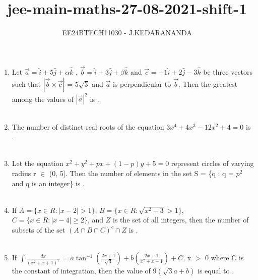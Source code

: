 \documentclass[journal]{IEEEtran}
\renewcommand{\thefigure}{\theenumi}
\renewcommand{\thetable}{\theenumi}
\numberwithin{equation}{enumi}
\numberwithin{figure}{enumi}
\renewcommand{\thetable}{\theenumi}
\begin{document}

\vspace{3cm}

\title{jee-main-maths-27-08-2021-shift-1}
\author{EE24BTECH11030 - J.KEDARANANDA}
{\let\newpage\relax\maketitle}
\renewcommand{\thefigure}{\theenumi}
\renewcommand{\thetable}{\theenumi}
\begin{enumerate}
    \item Let $\overset{\rightarrow}{a} = \hat{i} + 5\hat{j} + \alpha \hat{k}$ , $\overset{\rightarrow}{b} = \hat{i} + 3\hat{j} + \beta \hat{k}$ and $\overset{\rightarrow}{c} = -1\hat{i} + 2\hat{j} - 3\hat{k}$ be three vectors such that $|\overset{\rightarrow}{b} \times \overset{\rightarrow}{c}|$ = $5\sqrt{3}$ and
    $\overset{\rightarrow}{a}$ is perpendicular to $\overset{\rightarrow}{b}$. Then the greatest among the values of ${|\overset{\rightarrow}{a}|}^2$ is \underline{\hspace{1cm}}.\\\\
    \item The number of distinct real roots of the equation $3x^4 + 4x^3 - 12x^2 + 4 = 0$ is  \underline{\hspace{1cm}}. \\\\
    \item Let the equation $x^2 + y^2 + px + (1 - p)y + 5 = 0$ represent circles of varying radius r $\in$ (0, 5]. Then the number of elements in the set S = \{q : q = $p^2$ and q is an integer\} is \underline{\hspace{1cm}}. \\\\
    \item If $A = \{ x \in R : |x - 2| > 1 \}$, $B = \{ x \in R : \sqrt{x^2 - 3} > 1 \}$, $C = \{ x \in  R : |x - 4| \geq 2 \}$, and $Z$ is the set of all integers, then the number of subsets of the set $(A \cap B \cap C)^{c} \cap Z$ is \underline{\hspace{1cm}}. \\\\
    \item If $\int\frac{dx}{(x^2 + x +1)^{2}}$ = $a\tan^{-1}{\left(\frac{2x + 1}{\sqrt{3}}\right)} + b\left(\frac{2x + 1}{x^2 + x + 1}\right) + C$, x $>$ 0 where C is the constant of integration, then the value of $9(\sqrt{3}a + b)$ is equal to \underline{\hspace{1cm}}.\\\\

\end{enumerate}
\end{document}
